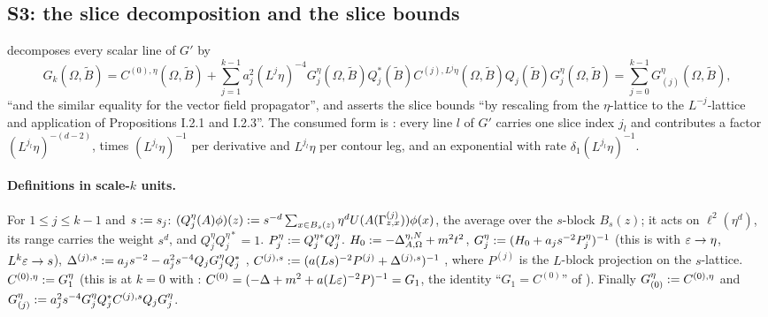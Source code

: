 
\subsection{S3: the slice decomposition \cite[(2.6)]{Ba3} and the slice bounds \cite[(2.10)--(2.12)]{Ba3}}\label{sup1:ssec:S3}

\cite[p.~424]{Ba3} decomposes every scalar line of $G'$ by
\begin{equation}\label{sup1:eq:26}
G_k(\Omega,\tilde B)=C^{(0),\eta}(\Omega,\tilde B)+\sum_{j=1}^{k-1}a_j^2(L^j\eta)^{-4}G^\eta_j(\Omega,\tilde B)Q^*_j(\tilde B)C^{(j),L^j\eta}(\Omega,\tilde B)Q_j(\tilde B)G^\eta_j(\Omega,\tilde B)=\sum_{j=0}^{k-1}G^\eta_{(j)}(\Omega,\tilde B),
\end{equation}
``and the similar equality for the vector field propagator'', and \cite[p.~426]{Ba3} asserts the slice bounds \cite[(2.10)--(2.12)]{Ba3} ``by rescaling from the $\eta$-lattice to the $L^{-j}$-lattice and application of Propositions I.2.1 and I.2.3''. The consumed form is \cite[(2.13)--(2.14)]{Ba3}: every line $l$ of $G'$ carries one slice index $j_l$ and contributes a factor $(L^{j_l}\eta)^{-(d-2)}$, times $(L^{j_l}\eta)^{-1}$ per derivative and $L^{j_l}\eta$ per contour leg, and an exponential with rate $\delta_1(L^{j_l}\eta)^{-1}$.

\paragraph{Definitions in scale-$k$ units.} For $1\le j\le k-1$ and $s:= s_j$: $(Q^\eta_j(A)\phi)(z):= s^{-d}\sum_{x\in B_s(z)}\eta^dU(A(\Gamma^{(j)}_{z,x}))\phi(x)$, the average over the $s$-block $B_s(z)$; it acts on $\ell^2(\eta^d)$, its range carries the weight $s^d$, and $Q^\eta_jQ^{\eta*}_j=1$. $P^\eta_j:= Q^{\eta*}_jQ^\eta_j$. $H_0:=-\Delta^{\eta,N}_{A,\Omega}+m^2t^2$, $G^\eta_j:=(H_0+a_js^{-2}P^\eta_j)^{-1}$ (this is \cite[(2.20)]{Ba1} with $\varepsilon\to\eta$, $L^k\varepsilon\to s$), $\Delta^{(j),s}:= a_js^{-2}-a_j^2s^{-4}Q_jG^\eta_jQ_j^*$ \cite[(2.21)]{Ba1}, $C^{(j),s}:=(a(Ls)^{-2}P^{(j)}+\Delta^{(j),s})^{-1}$ \cite[(2.30)]{Ba1}, where $P^{(j)}$ is the $L$-block projection on the $s$-lattice. $C^{(0),\eta}:= G^\eta_1$ (this is \cite[(2.30)]{Ba1} at $k=0$ with \cite[(2.17)]{Ba1}: $C^{(0)}=(-\Delta+m^2+a(L\varepsilon)^{-2}P)^{-1}=G_1$, the identity ``$G_1=C^{(0)}$'' of \cite[p.~612]{Ba1}). Finally $G^\eta_{(0)}:= C^{(0),\eta}$ and $G^\eta_{(j)}:= a_j^2s^{-4}G^\eta_jQ_j^*C^{(j),s}Q_jG^\eta_j$.

